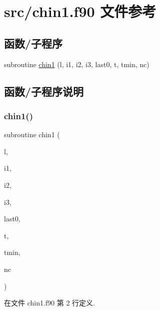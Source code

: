 \hypertarget{chin1_8f90}{}\section{src/chin1.f90 文件参考}
\label{chin1_8f90}
\subsection*{函数/子程序}
\begin{DoxyCompactItemize}
\item 
subroutine \mbox{\hyperlink{chin1_8f90_a380da5f30a76dc0d2af11b225bc929bd}{chin1}} (l, i1, i2, i3, last0, t, tmin, nc)
\end{DoxyCompactItemize}


\subsection{函数/子程序说明}
\mbox{\label{chin1_8f90_a380da5f30a76dc0d2af11b225bc929bd}} 
\subsubsection{\texorpdfstring{chin1()}{chin1()}}
{\footnotesize\ttfamily subroutine chin1 (\begin{DoxyParamCaption}\item[{}]{l,  }\item[{}]{i1,  }\item[{}]{i2,  }\item[{}]{i3,  }\item[{}]{last0,  }\item[{}]{t,  }\item[{}]{tmin,  }\item[{}]{nc }\end{DoxyParamCaption})}



在文件 chin1.\+f90 第 2 行定义.

